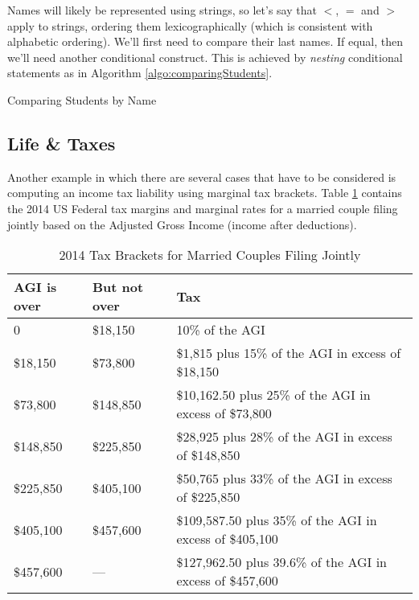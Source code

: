 Names will likely be represented using strings, so let's say that $<$, $=$ and $>$ apply
to strings, ordering them lexicographically (which is consistent with alphabetic ordering).
We'll first need to compare their last names.  If equal, then we'll need another conditional
construct.  This is achieved by  \emph{nesting} conditional statements as in Algorithm 
\ref{algo:comparingStudents}.


\begin{algorithm}[H]
\caption{Comparing Students by Name}
\label{algo:comparingStudents}
\end{algorithm}

\subsection{Life \& Taxes}
\label{subsubsection:lifeAndTaxes}

Another example in which there are several cases that have to be 
considered is computing an income tax liability using marginal tax brackets.  Table \ref{table:taxBrackets}
contains the 2014 US Federal tax margins and marginal rates for a married couple filing jointly based
on the Adjusted Gross Income (income after deductions).

\begin{table}[h]
\centering
\begin{tabular}{|l|l|p{}|}
\hline
AGI is over & But not over & Tax \\
\hline\hline
0 & \$18,150 & 10\% of the AGI\\
\hline
\$18,150 & \$73,800 & \$1,815 plus 15\% of the AGI in excess of \$18,150\\
\hline
\$73,800 & \$148,850 & \$10,162.50 plus 25\% of the AGI in excess of \$73,800\\
\hline
\$148,850 & \$225,850 & \$28,925 plus 28\% of the AGI in excess of \$148,850\\
\hline
\$225,850 & \$405,100 & \$50,765 plus 33\% of the AGI in excess of \$225,850\\
\hline
\$405,100 & \$457,600 & \$109,587.50 plus 35\% of the AGI in excess of \$405,100\\
\hline
\$457,600 & --- & \$127,962.50 plus 39.6\% of the AGI in excess of \$457,600\\
\hline
\end{tabular}
\caption{2014 Tax Brackets for Married Couples Filing Jointly}
\label{table:taxBrackets}
\end{table}

